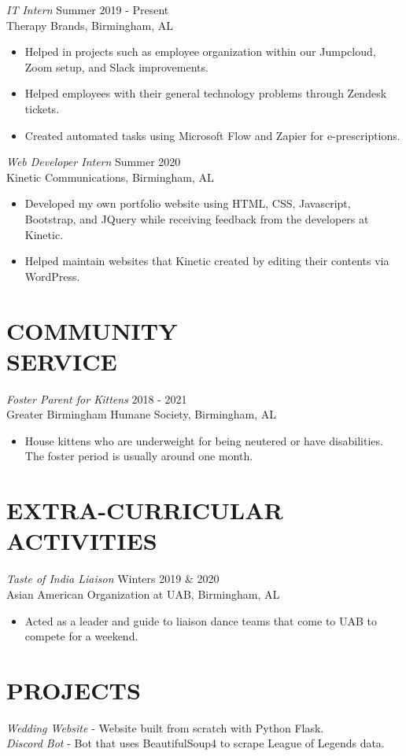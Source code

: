 \documentclass[margin, 10pt]{res} %
\begin{document}
\begin{resume}
{\sl IT Intern} \hfill Summer 2019 - Present \\
Therapy Brands, Birmingham, AL 
\begin{itemize} \itemsep -2pt %
\item Helped in projects such as employee organization within our Jumpcloud, Zoom setup, and Slack improvements.
\item Helped employees with their general technology problems through Zendesk tickets.
\item Created automated tasks using Microsoft Flow and Zapier for e-prescriptions.
\end{itemize} 

{\sl Web Developer Intern} \hfill Summer 2020 \\
Kinetic Communications, Birmingham, AL
\begin{itemize} \itemsep -2pt %
\item Developed my own portfolio website using HTML, CSS, Javascript, Bootstrap, and JQuery while receiving feedback from the developers at Kinetic. 
\item Helped maintain websites that Kinetic created by editing their contents via WordPress. 
\end{itemize}

\section{COMMUNITY \\ SERVICE}

{\sl Foster Parent for Kittens} \hfill 2018 - 2021 \\
Greater Birmingham Humane Society, Birmingham, AL
\begin{itemize}
\item House kittens who are underweight for being neutered or have disabilities. The foster period is usually around one month.
\end{itemize}


\section{EXTRA-CURRICULAR \\ ACTIVITIES} 

{\sl Taste of India Liaison} \hfill Winters 2019 \& 2020 \\
Asian American Organization at UAB, Birmingham, AL
\begin{itemize}
\item Acted as a leader and guide to liaison dance teams that come to UAB to compete for a weekend.
\end{itemize}

\section{PROJECTS}

{\sl Wedding Website} - Website built from scratch with Python Flask. \\
{\sl Discord Bot} - Bot that uses BeautifulSoup4 to scrape League of Legends data.



\end{resume}
\end{document}
